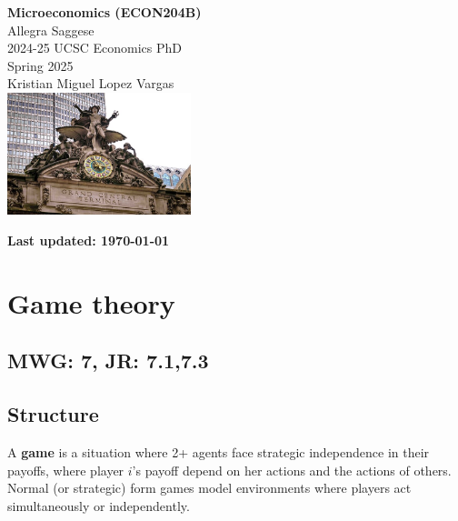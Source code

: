 \documentclass{article}
\begin{document}
\begin{titlepage}
    \centering
    \vspace{1in} %
    {\LARGE \textbf{Microeconomics (ECON204B)}} \\[0.5cm]
    {\LARGE Allegra Saggese} \\ [.5cm]
    {\large 2024-25 UCSC Economics PhD} \\ [1.5 cm]
    {\large Spring 2025} \\[.25cm]
    {\large Kristian Miguel Lopez Vargas} \\[1cm]
    \includegraphics[width=0.4\textwidth]{images/gst-cover.jpg} 
    \vfill
\end{titlepage}


\clearpage
\pagestyle{empty} %
\noindent \textbf{Last updated: \today} 
\vspace{0.5cm} %
\tableofcontents
\clearpage %
\pagestyle{plain} %




\section{Game theory}
\subsection{MWG: 7, JR: 7.1,7.3}
\subsection{Structure}

A \textbf{game} is a situation where 2+ agents face strategic independence in their payoffs, where player $i$'s payoff depend on her actions and the actions of others. Normal (or strategic) form games model environments where players act simultaneously or independently. \\
\end{document}
